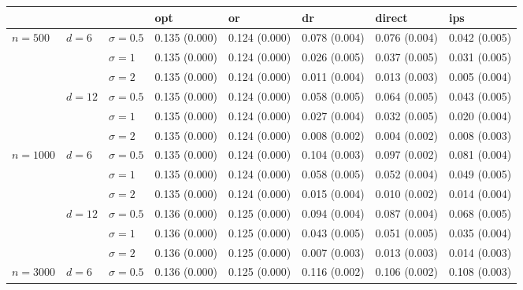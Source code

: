 \documentclass[11pt]{article} %
\theoremstyle{theorem}  %
\theoremstyle{plain}
\begin{document}
\begin{figure}[H]
\scriptsize
\centering
\begin{tabular}{llllllll}
\toprule
         &        &            &            opt &             or &             dr &         direct &            ips \\
\midrule
\multirow{6}{*}{$n=500$} & \multirow{3}{*}{$d=6$} & $\sigma=0.5$ &  0.135 (0.000) &  0.124 (0.000) &  0.078 (0.004) &  0.076 (0.004) &  0.042 (0.005) \\
         &        & $\sigma=1$ &  0.135 (0.000) &  0.124 (0.000) &  0.026 (0.005) &  0.037 (0.005) &  0.031 (0.005) \\
         &        & $\sigma=2$ &  0.135 (0.000) &  0.124 (0.000) &  0.011 (0.004) &  0.013 (0.003) &  0.005 (0.004) \\
\cline{2-8}
         & \multirow{3}{*}{$d=12$} & $\sigma=0.5$ &  0.135 (0.000) &  0.124 (0.000) &  0.058 (0.005) &  0.064 (0.005) &  0.043 (0.005) \\
         &        & $\sigma=1$ &  0.135 (0.000) &  0.124 (0.000) &  0.027 (0.004) &  0.032 (0.005) &  0.020 (0.004) \\
         &        & $\sigma=2$ &  0.135 (0.000) &  0.124 (0.000) &  0.008 (0.002) &  0.004 (0.002) &  0.008 (0.003) \\
\cline{1-8}
\cline{2-8}
\multirow{6}{*}{$n=1000$} & \multirow{3}{*}{$d=6$} & $\sigma=0.5$ &  0.135 (0.000) &  0.124 (0.000) &  0.104 (0.003) &  0.097 (0.002) &  0.081 (0.004) \\
         &        & $\sigma=1$ &  0.135 (0.000) &  0.124 (0.000) &  0.058 (0.005) &  0.052 (0.004) &  0.049 (0.005) \\
         &        & $\sigma=2$ &  0.135 (0.000) &  0.124 (0.000) &  0.015 (0.004) &  0.010 (0.002) &  0.014 (0.004) \\
\cline{2-8}
         & \multirow{3}{*}{$d=12$} & $\sigma=0.5$ &  0.136 (0.000) &  0.125 (0.000) &  0.094 (0.004) &  0.087 (0.004) &  0.068 (0.005) \\
         &        & $\sigma=1$ &  0.136 (0.000) &  0.125 (0.000) &  0.043 (0.005) &  0.051 (0.005) &  0.035 (0.004) \\
         &        & $\sigma=2$ &  0.136 (0.000) &  0.125 (0.000) &  0.007 (0.003) &  0.013 (0.003) &  0.014 (0.003) \\
\cline{1-8}
\cline{2-8}
\multirow{6}{*}{$n=3000$} & \multirow{3}{*}{$d=6$} & $\sigma=0.5$ &  0.136 (0.000) &  0.125 (0.000) &  0.116 (0.002) &  0.106 (0.002) &  0.108 (0.003) \\

\end{tabular}
\end{figure}
\end{document}
